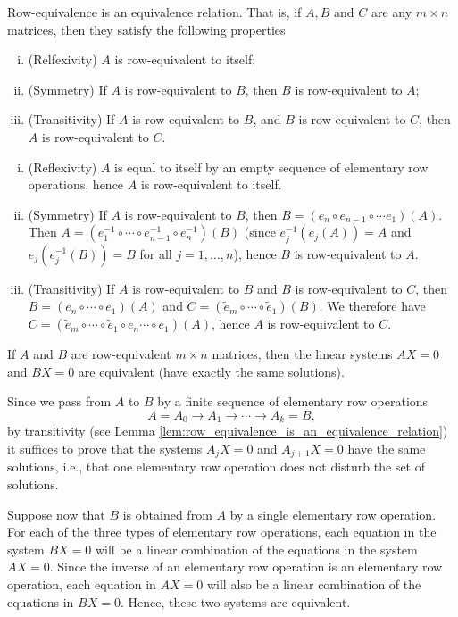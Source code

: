 \documentclass[12pt,letterpaper,reqno]{article}
\numberwithin{equation}{section}
\begin{document}
\begin{lem}\label{lem:row_equivalence_is_an_equivalence_relation}
Row-equivalence is an equivalence relation. That is, if $A,B$ and $C$ are any $m \times n$ matrices, then they satisfy the following properties
\begin{enumerate}[(i)]
	\item (Relfexivity) $A$ is row-equivalent to itself;
	\item (Symmetry) If $A$ is row-equivalent to $B$, then $B$ is row-equivalent to $A$;
	\item (Transitivity) If $A$ is row-equivalent to $B$, and $B$ is row-equivalent to $C$, then $A$ is row-equivalent to $C$.
\end{enumerate}
\end{lem}
\begin{pf}
\begin{enumerate}[(i)]
	\item (Reflexivity) $A$ is equal to itself by an empty sequence of elementary row operations, hence $A$ is row-equivalent to itself. 
	\item (Symmetry) If $A$ is row-equivalent to $B$, then $B=(e_n \circ e_{n-1} \circ \cdots e_1)(A)$. Then $A=(e_1^{-1}\circ \cdots \circ e_{n-1}^{-1} \circ e_n^{-1})(B)$ (since $e_j^{-1}(e_j(A))=A$ and $e_j(e_j^{-1}(B))=B$ for all $j=1,\dots,n$), hence $B$ is row-equivalent to $A$. 
	\item (Transitivity) If $A$ is row-equivalent to $B$ and $B$ is row-equivalent to $C$, then $B=(e_n \circ \cdots \circ e_1)(A)$ and $C=(\tilde{e}_m \circ \cdots \circ \tilde{e}_1)(B)$. We therefore have $C=(\tilde{e}_m \circ \cdots \circ \tilde{e}_1\circ e_n \cdots \circ e_1)(A)$, hence $A$ is row-equivalent to $C$.
\end{enumerate}	
\end{pf}

\begin{thm}\label{thm:row_equivalence_implies_equivalence}
	If $A$ and $B$ are row-equivalent $m \times n$ matrices, then the linear systems $AX=0$ and $BX=0$ are equivalent (have exactly the same solutions).	
\end{thm}

\begin{pf}
	Since we pass from $A$ to $B$ by a finite sequence of elementary row operations
$$A=A_0 \to A_1 \to \cdots \to A_k=B,$$
by transitivity (see Lemma \ref{lem:row_equivalence_is_an_equivalence_relation}) it suffices to prove that the systems $A_jX=0$ and $A_{j+1}X=0$ have the same solutions, i.e., that one elementary row operation does not disturb the set of solutions. 

 Suppose now that $B$ is obtained from $A$ by a single elementary row operation. For each of the three types of elementary row operations, each equation in the system $BX=0$ will be a linear combination of the equations in the system $AX=0$. Since the inverse of an elementary row operation is an elementary row operation, each equation in $AX=0$ will also be a linear combination of the equations in $BX=0$. Hence, these two systems are equivalent.
\end{pf}
\end{document}
